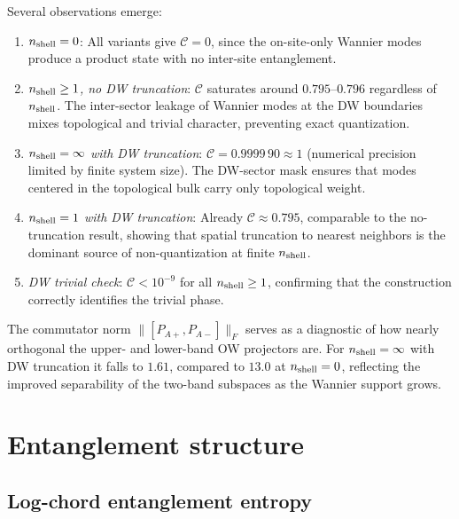 \documentclass[aps,prb,twocolumn,showpacs,floatfix]{revtex4-2}
\newcommand{\nshell}{n_{\rm shell}}
\newcommand{\Cchern}{\mathcal{C}}
\begin{document}
Several observations emerge:
\begin{enumerate}
  \item \emph{$\nshell = 0$}: All variants give $\Cchern = 0$, since the on-site-only
    Wannier modes produce a product state with no inter-site entanglement.
  \item \emph{$\nshell \geq 1$, no DW truncation}: $\Cchern$ saturates around $0.795$--$0.796$
    regardless of $\nshell$.  The inter-sector leakage of Wannier modes at the DW boundaries
    mixes topological and trivial character, preventing exact quantization.
  \item \emph{$\nshell = \infty$ with DW truncation}: $\Cchern = 0.9999\,90 \approx 1$
    (numerical precision limited by finite system size).  The DW-sector mask ensures
    that modes centered in the topological bulk carry only topological weight.
  \item \emph{$\nshell = 1$ with DW truncation}: Already $\Cchern \approx 0.795$,
    comparable to the no-truncation result, showing that spatial truncation to nearest
    neighbors is the dominant source of non-quantization at finite $\nshell$.
  \item \emph{DW trivial check}: $\Cchern < 10^{-9}$ for all $\nshell \geq 1$, confirming
    that the construction correctly identifies the trivial phase.
\end{enumerate}

The commutator norm $\|[P_{A+}, P_{A-}]\|_F$ serves as a diagnostic of how nearly
orthogonal the upper- and lower-band OW projectors are.  For $\nshell = \infty$ with
DW truncation it falls to $1.61$, compared to $13.0$ at $\nshell = 0$,
reflecting the improved separability of the two-band subspaces as the Wannier support grows.

\section{Entanglement structure}
\label{sec:entanglement}

\subsection{Log-chord entanglement entropy}
\end{document}
